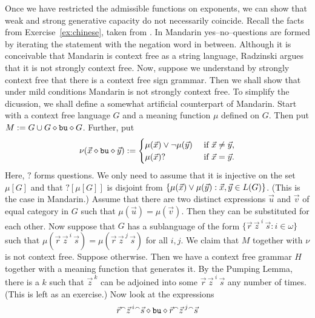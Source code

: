 Once we have restricted the admissible functions on exponents, 
we can show that weak and strong generative capacity do not 
necessarily coincide. Recall the facts from Exercise~\ref{ex:chinese}, 
taken from \cite{radzinski:copying}. In Mandarin yes--no--questions are 
formed by iterating the statement with the negation word in between. 
Although it is conceivable that
Mandarin is context free as a string language, Radzinski 
argues that it is not strongly context free. Now, suppose we understand
by strongly context free that there is a context free sign grammar.
Then we shall show that under mild conditions Mandarin is not
strongly context free. To simplify the dicussion, we shall define
a somewhat artificial counterpart of Mandarin. Start with a context 
free language $G$ and a meaning function $\mu$ defined on $G$. Then 
put $M := G \cup G \diamond \mbox{\tt bu}\diamond G$.
Further, put
\begin{equation}
\nu(\vec{x}\diamond\mbox{\tt bu}\diamond\vec{y}) :=
    \begin{cases}
    \mu(\vec{x}) \vee \neg \mu(\vec{y}) &
        \text{ if $\vec{x} \neq \vec{y}$,} \\
    \mu(\vec{x})? & \text{ if $\vec{x} = \vec{y}$.}
    \end{cases}
\end{equation}
Here, $?$ forms questions. We only need to assume that it is 
injective on the set $\mu[G]$ and that $?[\mu[G]]$ is disjoint 
from $\{\mu(\vec{x}) \vee \mu(\vec{y}) : \vec{x}, \vec{y} \in 
L(G)\}$. (This is the case in Mandarin.) Assume that
there are two distinct expressions $\vec{u}$ and $\vec{v}$ of 
equal category in $G$ such that $\mu(\vec{u}) = \mu(\vec{v})$. 
Then they can be substituted for each other. Now suppose that 
$G$ has a sublanguage of the form $\{\vec{r}\, {\vec{z}\,}^i\, \vec{s} :
i \in \omega\}$ such that $\mu(\vec{r}\, {\vec{z}\,}^i\, \vec{s}) =
\mu(\vec{r}\, {\vec{z}\,}^j\, \vec{s})$ for all $i, j$. We claim 
that $M$ together with $\nu$ is not context free. Suppose otherwise. 
Then we have a context free grammar $H$ together with a meaning 
function that generates it. By the Pumping Lemma, there is a $k$ 
such that ${\vec{z}\,}^k$ can be adjoined into some 
$\vec{r}\, {\vec{z}\,}^i\, \vec{s}$ any number of times. (This is 
left as an exercise.) Now look at the expressions
\begin{equation}
\vec{r}{^{\smallfrown}} {\vec{z}\,}^i{^{\smallfrown}}\vec{s}\diamond\mbox{\tt bu}\diamond
\vec{r}{^{\smallfrown}}{\vec{z}\,}^{j} {^{\smallfrown}}\vec{s}
\end{equation}
